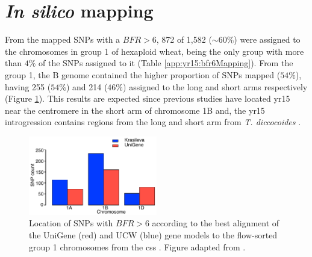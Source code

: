 \section{\textit{In silico} mapping}
\label{sub:yr15:inSilico}
From the mapped SNPs with a $BFR>6$, 872 of 1,582 ($\sim60\%$) were assigned to the chromosomes in group 1 of hexaploid wheat, being the only group with more than $4\%$ of the SNPs assigned to it (Table \ref{app:yr15:bfr6Mapping}). 
From the group 1, the B genome contained the higher proportion of SNPs mapped ($54\%$), having 255 ($54\%$) and 214 ($46\%$) assigned to the long and short arms respectively (Figure \ref{fig:yr15:snpsBFR6Group1}).  
This results are expected since previous studies have located \acrshort{yr15} near the centromere in the short arm of chromosome 1B and, the \acrshort{yr15} introgression contains regions from the long and short arm from \textit{T. diccocoides} \citep{Murphy2009,Peng2000,Grama1997}. 

\begin{figure}
  \centering
    \includegraphics[width=0.5\textwidth]{Yr15/Figures/mapping/snpsBFR6Group1.pdf}
  \caption[Location of SNPs with BFR\textgreater6.]{Location of SNPs with $BFR>6$ according to the best alignment of the UniGene (red) and UCW (blue) gene models to the flow-sorted group 1 chromosomes from the \gls{css} \citep{Mayer2014}. Figure adapted from \citet{Ramirez-Gonzalez2015b}.} 
  \label{fig:yr15:snpsBFR6Group1}
\end{figure}



